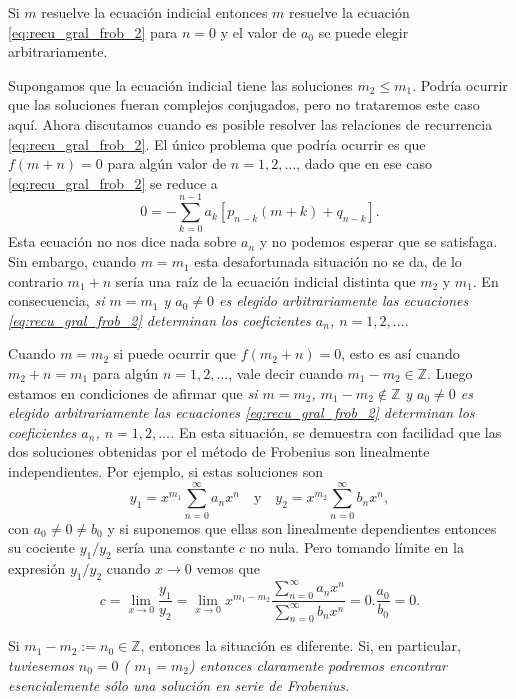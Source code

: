 Si $m$ resuelve la ecuación indicial entonces $m$ resuelve la ecuación \eqref{eq:recu_gral_frob_2} para $n=0$ y el valor de $a_0$ se puede elegir arbitrariamente.

Supongamos que la ecuación indicial tiene las soluciones $m_2\leq m_1$. Podría ocurrir que las soluciones fueran complejos conjugados, pero no trataremos este caso aquí. Ahora discutamos cuando es posible resolver las relaciones de recurrencia \eqref{eq:recu_gral_frob_2}. El único problema que podría ocurrir es que  $f(m+n)=0$ para algún valor de $n=1,2,\ldots$, dado que en ese caso \eqref{eq:recu_gral_frob_2} se reduce a
\begin{equation}\label{eq:ec_enter} 0=-\sum_{k=0}^{n-1}a_k\left[p_{n-k}(m+k) +
q_{n-k}\right].
\end{equation}
Esta ecuación no nos dice nada sobre $a_n$ y no podemos esperar que se satisfaga. Sin embargo, cuando $m=m_1$ esta desafortunada situación no se da, de lo contrario  $m_1+n$ sería una raíz de la ecuación indicial distinta que $m_2$ y $m_1$. En consecuencia, \emph{si $m=m_1$ y $a_0\neq 0$ es elegido arbitrariamente las ecuaciones \eqref{eq:recu_gral_frob_2} determinan los coeficientes $a_n$, $n=1,2,\ldots$.}

Cuando $m=m_2$ si puede ocurrir que $f(m_2+n)=0$, esto es así cuando $m_2+n=m_1$ para algún $n=1,2,\ldots$, vale decir cuando $m_1-m_2\in\mathbb{Z}$.  Luego estamos en condiciones de afirmar que \emph{si $m=m_2$, $m_1-m_2\notin \mathbb{Z}$ y $a_0\neq 0$ es elegido arbitrariamente las ecuaciones \eqref{eq:recu_gral_frob_2} determinan los coeficientes $a_n$, $n=1,2,\ldots$.} En esta situación, se demuestra con facilidad que las dos soluciones obtenidas por el método de Frobenius son linealmente independientes. Por ejemplo, si estas soluciones son
\[y_1=x^{m_1}\sum_{n=0}^{\infty}a_nx^n\quad\text{y}\quad y_2=x^{m_2}\sum_{n=0}^{\infty}b_nx^n,\]
con $a_0\neq 0\neq b_0$ y si suponemos que ellas son linealmente dependientes entonces su cociente $y_1/y_2$ sería una constante $c$  no nula. Pero tomando límite en la expresión $y_1/y_2$ cuando $x\to 0$ vemos que
\[c=\lim_{x\to 0} \frac{y_1}{y_2}=\lim_{x\to 0} x^{m_1-m_2}\frac{\sum_{n=0}^{\infty}a_nx^n}{ \sum_{n=0}^{\infty}b_nx^n  }=0.\frac{a_0}{b_0}=0.\]

Si $m_1-m_2:=n_0\in\mathbb{Z}$, entonces la situación es diferente. Si, en particular,  \emph{tuviesemos $n_0=0$ ( $m_1=m_2$) entonces claramente podremos encontrar esencialemente sólo una solución en serie de Frobenius.}





